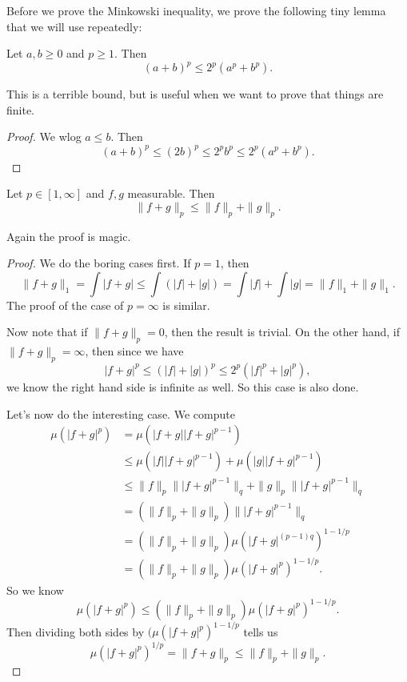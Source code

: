 \documentclass[a4paper]{article}
\begin{document}
Before we prove the Minkowski inequality, we prove the following tiny lemma that we will use repeatedly:
\begin{lemma}
  Let $a, b \geq 0$ and $p \geq 1$. Then
  \[
    (a + b)^p \leq 2^p(a^p + b^p).
  \]
\end{lemma}
This is a terrible bound, but is useful when we want to prove that things are finite.

\begin{proof}
  We wlog $a \leq b$. Then
  \[
    (a + b)^p \leq (2b)^p \leq 2^p b^p \leq 2^p(a^p + b^p).
  \]
\end{proof}
\begin{thm}
  Let $p \in [1, \infty]$ and $f, g$ measurable. Then
  \[
    \|f + g\|_p \leq \|f\|_p + \|g\|_p.
  \]
\end{thm}

Again the proof is magic.
\begin{proof}
  We do the boring cases first. If $p = 1$, then
  \[
    \|f + g\|_1 = \int |f + g| \leq \int (|f| + |g|) = \int |f| + \int |g| = \|f\|_1 + \|g\|_1.
  \]
  The proof of the case of $p = \infty$ is similar.

  Now note that if $\|f + g\|_p = 0$, then the result is trivial. On the other hand, if $\|f + g\|_p = \infty$, then since we have
  \[
    |f + g|^p \leq (|f| + |g|)^p \leq 2^p(|f|^p + |g|^p),
  \]
  we know the right hand side is infinite as well. So this case is also done.

  Let's now do the interesting case. We compute
  \begin{align*}
    \mu(|f + g|^p) &= \mu(|f + g| |f + g|^{p - 1}) \\
    &\leq \mu(|f||f + g|^{p - 1}) + \mu(|g||f + g|^{p - 1})\\
    &\leq \|f\|_p \||f + g|^{p - 1}\|_q + \|g\|_p \||f + g|^{p - 1}\|_q\\
    &= (\|f\|_p + \|g\|_p) \||f + g|^{p - 1}\|_q\\
    &= (\|f\|_p + \|g\|_p) \mu(|f + g|^{(p - 1)q})^{1 - 1/p}\\
    &= (\|f\|_p + \|g\|_p) \mu(|f + g|^p)^{1 - 1/p}.
  \end{align*}
  So we know
  \[
    \mu(|f + g|^p) \leq (\|f\|_p + \|g\|_p) \mu(|f + g|^p)^{1 - 1/p}.
  \]
  Then dividing both sides by $(\mu(|f + g|^p)^{1 - 1/p}$ tells us
  \[
    \mu(|f + g|^p)^{1/p} = \|f + g\|_p \leq \|f\|_p + \|g\|_p.
  \]
\end{proof}
\end{document}
